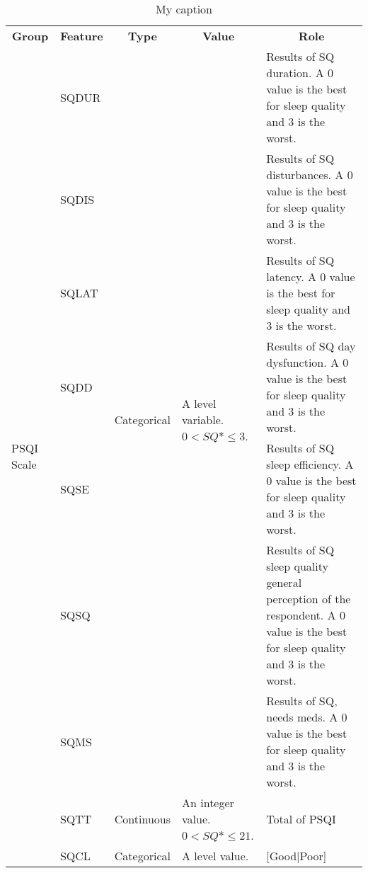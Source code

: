 \documentclass[10pt,letterpaper,oneside]{article}
\begin{document}
	\begin{table}[]
		\centering
		\caption{My caption}
		\label{my-label}
		\begin{tabular}{lllll}
			\multicolumn{1}{c}{\textbf{Group}} & \multicolumn{1}{c}{\textbf{Feature}} & \multicolumn{1}{c}{\textbf{Type}} & \multicolumn{1}{c}{\textbf{Value}}                     & \multicolumn{1}{c}{\textbf{Role}} \\
			\multirow{9}{*}{PSQI Scale} & SQDUR & \multirow{7}{*}{Categorical} & \multirow{7}{*}{A level variable. $ 0 < SQ*\leq 3 $.} & Results of SQ duration. A 0 value is the best for sleep quality and 3 is the worst.                                           \\
			& SQDIS &                              &                                                       & Results of SQ disturbances. A 0 value is the best for sleep quality and 3 is the worst.                                       \\
			& SQLAT &                              &                                                       & Results of SQ latency. A 0 value is the best for sleep quality and 3 is the worst.                                            \\
			& SQDD  &                              &                                                       & Results of SQ day dysfunction. A 0 value is the best for sleep quality and 3 is the worst.                                    \\
			& SQSE  &                              &                                                       & Results of SQ sleep efficiency. A 0 value is the best for sleep quality and 3 is the worst.                                   \\
			& SQSQ  &                              &                                                       & Results of SQ sleep quality general perception of the respondent. A 0 value is the best for sleep quality and 3 is the worst. \\
			& SQMS  &                              &                                                       & Results of SQ, needs meds. A 0 value is the best for sleep quality and 3 is the worst.                                        \\
			& SQTT  & Continuous                   & An integer value. $ 0 < SQ*\leq 21 $.                 & Total of PSQI                                                                                                                 \\
			& SQCL  & Categorical                  & A level value.                                        & {[}Good|Poor{]}                                                                                                              
		\end{tabular}
	\end{table}
\end{document}
